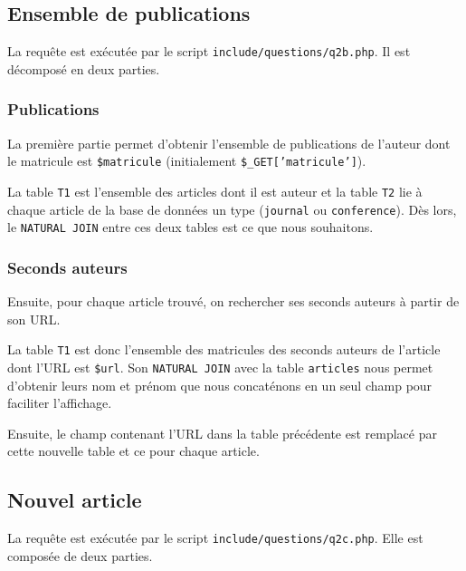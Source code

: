 \documentclass[a4paper, 12pt]{article}
\begin{document}
    \subsection{Ensemble de publications}
    La requête est exécutée par le script \texttt{include/questions/q2b.php}. Il est décomposé en deux parties.
    \subsubsection{Publications}
    La première partie permet d'obtenir l'ensemble de publications de l'auteur dont le matricule est \texttt{\$matricule} (initialement \texttt{\$\_GET['matricule']}).
    
    La table \texttt{T1} est l'ensemble des articles dont il est auteur et la table \texttt{T2} lie à chaque article de la base de données un type (\texttt{journal} ou \texttt{conference}). Dès lors, le \texttt{NATURAL JOIN} entre ces deux tables est ce que nous souhaitons.
    \subsubsection{Seconds auteurs}
    Ensuite, pour chaque article trouvé, on rechercher ses seconds auteurs à partir de son URL. \newpage
    
    La table \texttt{T1} est donc l'ensemble des matricules des seconds auteurs de l'article dont l'URL est \texttt{\$url}. Son \texttt{NATURAL JOIN} avec la table \texttt{articles} nous permet d'obtenir leurs nom et prénom que nous concaténons en un seul champ pour faciliter l'affichage. \par
    Ensuite, le champ contenant l'URL dans la table précédente est remplacé par cette nouvelle table et ce pour chaque article.
    \subsection{Nouvel article}\label{sec:nouvel-article}
    La requête est exécutée par le script \texttt{include/questions/q2c.php}. Elle est composée de deux parties.
\end{document}
